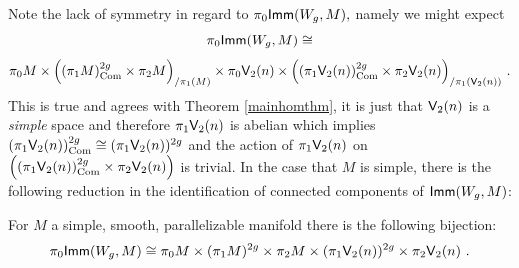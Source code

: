 Note the lack of symmetry in regard to $\pi_{0}{\sf Imm}(W_{g}, M),$ namely we might expect 
\[
\pi_{0}{\sf Imm}(W_{g}, M) \cong 
\]
\[
\pi_{0}M \times \Bigl((\pi_{1}M)_{\rm Com}^{2g} \times \pi_{2}M \Bigr)_{/\pi_1(M)}
\times 
\pi_{0}\mathsf V_{2}(n) \times \Bigl( (\pi_{1}\mathsf V_{2}(n))_{\rm Com}^{2g} \times \pi_{2}\mathsf V_{2}(n) \Bigr)_{/\pi_1(\mathsf V_{2}(n))}~.
\]
This is true and agrees with Theorem \ref{mainhomthm}, it is just that $\mathsf V_{2}(n)$ is a \textit{simple} space and therefore $\pi_{1}\mathsf V_{2}(n)$ is abelian which implies $(\pi_{1}\mathsf V_{2}(n))_{\rm Com}^{2g} \cong (\pi_{1}\mathsf V_{2}(n))^{2g}$ and the action of $\pi_{1}\mathsf V_{2}(n)$ on $\Bigl( (\pi_{1}\mathsf V_{2}(n))_{\rm Com}^{2g} \times \pi_{2}\mathsf V_{2}(n) \Bigr)$ is trivial. In the case that $M$ is simple, there is the following reduction in the identification of connected components of ${\sf Imm}(W_{g}, M)$:
\begin{cor} \label{sconcomp}
For $M$ a simple, smooth, parallelizable manifold there is the following bijection:
\[
\pi_{0}{\sf Imm}(W_{g}, M) \cong \pi_{0}M \times (\pi_{1}M)^{2g} \times \pi_{2}M
\times (\pi_{1}\mathsf V_{2}(n))^{2g} \times \pi_{2}\mathsf V_{2}(n) ~.
\]
\end{cor}

 

